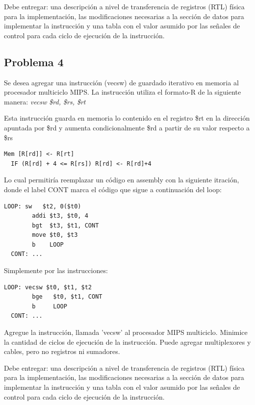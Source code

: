 \documentclass[letterpaper,11pt,notitlepage]{article}
\begin{document}
Debe entregar: una descripción a nivel de transferencia de registros (RTL) física para la implementación, las modificaciones necesarias a la sección de datos para implementar la instrucción y una tabla con el valor asumido por las señales de control para cada ciclo de ejecución de la instrucción.

\subsection*{Problema 4}

Se desea agregar una instrucción (vecsw) de guardado iterativo en memoria al procesador multiciclo MIPS. La instrucción utiliza el formato-R de la siguiente manera: \textit{vecsw \$rd, \$rs, \$rt}

Esta instrucción guarda en memoria lo contenido en el registro \$rt en la dirección apuntada por \$rd y aumenta condicionalmente \$rd a partir de su valor respecto a \$rs
\begin{lstlisting}[style=C]
  Mem [R[rd]] <- R[rt]
  IF (R[rd] + 4 <= R[rs]) R[rd] <- R[rd]+4
\end{lstlisting}

Lo cual permitiría reemplazar un código en assembly con la siguiente itración, donde el label CONT marca el código que sigue a continuación del loop:
\begin{lstlisting}[style=C]
  LOOP: sw   $t2, 0($t0)
        addi $t3, $t0, 4
        bgt  $t3, $t1, CONT
        move $t0, $t3
        b    LOOP
  CONT: ... 
\end{lstlisting}

Simplemente por las instrucciones:
\begin{lstlisting}[style=C]
  LOOP: vecsw $t0, $t1, $t2
        bge   $t0, $t1, CONT
        b     LOOP
  CONT: ...
      \end{lstlisting}

Agregue la instrucción, llamada 'vecsw' al procesador MIPS multiciclo. Minimice la cantidad de ciclos de ejecución de la instrucción. Puede agregar multiplexores y cables, pero no registros ni sumadores.

Debe entregar: una descripción a nivel de transferencia de registros (RTL) física para la implementación, las modificaciones necesarias a la sección de datos para implementar la instrucción y una tabla con el valor asumido por las señales de control para cada ciclo de ejecución de la instrucción.

\newpage
\end{document}
